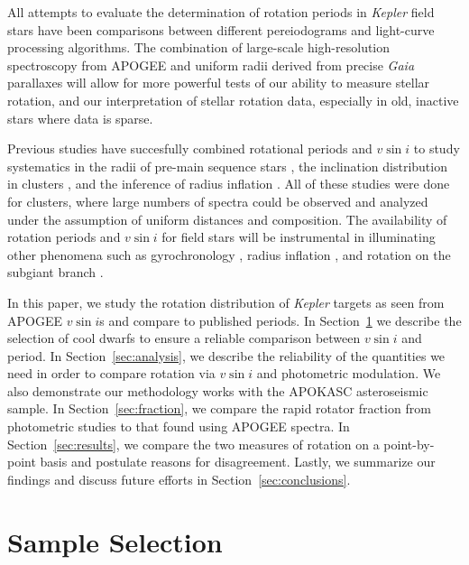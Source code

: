 \documentclass[manuscript]{aastex6}
\newcommand{\vsini}{\ensuremath{v \sin i}}
\newcommand{\Kepler}{\mbox{\textit{Kepler}}}
\newcommand{\Gaia}{\mbox{\textit{Gaia}}}
\begin{document}
All attempts to evaluate the determination of rotation periods in
\Kepler{} field stars have been comparisons between different pereiodograms and
light-curve processing algorithms. The combination of large-scale
high-resolution spectroscopy from APOGEE and uniform radii derived from precise
\Gaia{} parallaxes \citep{Stevens17} will allow for more powerful tests of our
ability to measure stellar rotation, and our interpretation of stellar rotation
data, especially in old, inactive stars where data is sparse.

Previous studies have succesfully combined rotational periods and \vsini{} 
to study systematics in the radii of pre-main sequence stars
\citep{Rhode01,Jeffries07}, the inclination distribution in clusters 
\citep{Jackson10}, and the inference of radius inflation
\citep{Jackson09,Jackson16,Jackson18}. All of these studies were done for
clusters, where large numbers of spectra could be observed and analyzed under 
the assumption of uniform distances and composition. The availability of
rotation periods and \vsini{} for field stars will be instrumental in 
illuminating other phenomena such as gyrochronology 
\citep{Barnes07,Mamajek08,Angus15}, radius inflation \citep{Jackson18}, and 
rotation on the subgiant branch \citep{vanSaders13}.

In this paper, we study the rotation distribution of \Kepler{} targets as
seen from APOGEE \vsini{}s and compare to published periods. In 
Section~\ref{sec:sample} we describe the
selection of cool dwarfs to ensure a reliable comparison between
\vsini{} and period. In Section~\ref{sec:analysis}, we describe the reliability
of the quantities we need in order to compare rotation via \vsini{} and
photometric modulation. We also demonstrate our methodology works with the 
APOKASC asteroseismic sample. In Section~\ref{sec:fraction}, we compare the 
rapid rotator fraction from photometric studies to that found using APOGEE 
spectra. In Section~\ref{sec:results}, we compare the two measures of 
rotation on a point-by-point basis and postulate reasons for disagreement. 
Lastly, we summarize our findings and discuss future efforts in 
Section~\ref{sec:conclusions}.

\section{Sample Selection}
\label{sec:sample}
\end{document}
